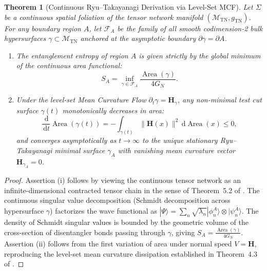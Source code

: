 \documentclass[11pt,a4paper,reqno]{amsart}
\newtheorem{theorem}{Theorem}[section]
\theoremstyle{definition}
\numberwithin{equation}{section}
\providecommand{\Area}{\operatorname{Area}}
\newcommand{\dif}{\,\mathrm{d}}
\begin{document}
\begin{theorem}[Continuous Ryu--Takayanagi Derivation via Level-Set MCF]
\label{thm:continuous_rt}
Let $\Sigma$ be a continuous spatial foliation of the tensor network manifold $(\mathcal{M}_{\mathrm{TN}}, g_{\mathrm{TN}})$. For any boundary region $A$, let $\mathcal{F}_A$ be the family of all smooth codimension-2 bulk hypersurfaces $\gamma \subset \mathcal{M}_{\mathrm{TN}}$ anchored at the asymptotic boundary $\partial \gamma = \partial A$.
\begin{enumerate}[label=(\roman*)]
    \item The entanglement entropy of region $A$ is given strictly by the global minimum of the continuous area functional:
    \begin{equation}
        \label{eq:rt_formula}
        S_A = \inf_{\gamma \in \mathcal{F}_A} \frac{\Area(\gamma)}{4 G_N}.
    \end{equation}
    \item Under the level-set Mean Curvature Flow $\partial_t \gamma = \mathbf{H}_\gamma$, any non-minimal test cut surface $\gamma(t)$ monotonically decreases in area:
    \begin{equation}
        \frac{\dif}{\dif t} \Area(\gamma(t)) = -\int_{\gamma(t)} \|\mathbf{H}(x)\|^2 \dif \Area(x) \le 0,
    \end{equation}
    and converges asymptotically as $t \to \infty$ to the unique stationary Ryu--Takayanagi minimal surface $\gamma_A$ with vanishing mean curvature vector $\mathbf{H}_{\gamma_A} = 0$.
\end{enumerate}
\end{theorem}
\begin{proof}
Assertion (i) follows by viewing the continuous tensor network as an infinite-dimensional contracted tensor chain in the sense of Theorem~5.2 of \cite{silvafilho2026flows}. The continuous singular value decomposition (Schmidt decomposition across hypersurface $\gamma$) factorizes the wave functional as $|\Psi\rangle = \sum_n \sqrt{\lambda_n} |\phi_n^A\rangle \otimes |\psi_n^{\bar{A}}\rangle$. The density of Schmidt singular values is bounded by the geometric volume of the cross-section of disentangler bonds passing through $\gamma$, giving $S_A = \frac{\Area(\gamma)}{4 G_N}$. Assertion (ii) follows from the first variation of area under normal speed $V = \mathbf{H}$, reproducing the level-set mean curvature dissipation established in Theorem~4.3 of \cite{silvafilho2026flows}.
\end{proof}
\end{document}
